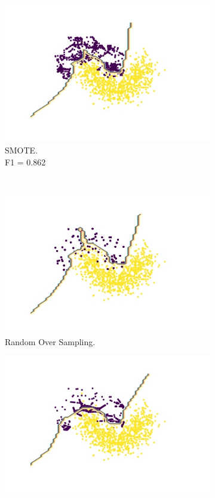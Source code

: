 \begin{figure}[tp]
\begin{subfigure}[]{0.3\linewidth}
		\includegraphics[width=\linewidth]{Figures/moon/SMOTE}
		\caption{SMOTE. \\F1 = 0.862}
		\label{fig:smote_moon}
	\end{subfigure}
	\\
	\begin{subfigure}[]{0.3\linewidth}
		\includegraphics[width=\linewidth]{Figures/moon/OverSampling}
		\caption{ Random Over Sampling.\\  }
		\label{fig:oversampling_moon}
	\end{subfigure}
	\hspace{0.1em}%
	\begin{subfigure}[]{0.3\linewidth}
		\includegraphics[width=\linewidth]{Figures/moon/BorderlineSMOTE}

\end{subfigure}
\end{figure}
